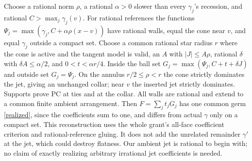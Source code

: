 \documentclass[11pt]{article}
\theoremstyle{definition}\newtheorem{definition}[theorem]{Definition}
\theoremstyle{remark}\newtheorem{remark}[theorem]{Remark}
\begin{document}
Choose a rational norm $\rho$, a rational $\alpha>0$ slower than every $\gamma_j$'s recession, and rational $C>\max_j\gamma_j(v)$. For rational references the functions
$\Psi_j=\max(\gamma_j,C+\alpha\rho(x-v))$
have rational walls, equal the cone near $v$, and equal $\gamma_j$ outside a compact set. Choose a common rational star radius $r$ where the cone is active and the tangent model is valid, an $A$ with $|J|\leq A\rho$, rational $\delta$ with $\delta A\leq\alpha/2$, and $0<t<\alpha r/4$. Inside the ball set
$G_j=\max(\Psi_j,C+t+\delta J)$ and outside set $G_j=\Psi_j$. On the annulus $r/2\leq\rho<r$ the cone strictly dominates the jet, giving an unchanged collar; near $v$ the inserted jet strictly dominates. Supports prove PC at ties and at the collar. All walls are rational and extend to a common finite ambient arrangement. Then $F=\sum_jt_jG_j$ has one common germ \eqref{realized}, since the coefficients sum to one, and differs from actual $\gamma$ only on a compact set. This reconstruction uses the whole grant's all-face coefficient criterion and rational-reference gluing. It does not add the unrelated remainder $\gamma'$ at the jet, which could destroy flatness. Our ambient jet is rational to begin with; no claim of exactly realizing arbitrary irrational jet coefficients is needed.
\end{document}
